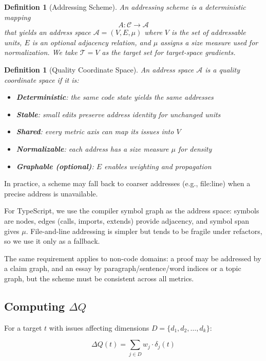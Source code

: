 \documentclass[11pt,a4paper]{article}
\newtheorem{definition}[theorem]{Definition}
\begin{document}
\begin{definition}[Addressing Scheme]
An addressing scheme is a deterministic mapping
\[
A: \mathcal{C} \to \mathcal{A}
\]
that yields an address space $\mathcal{A} = (V, E, \mu)$ where $V$ is the set of addressable units, $E$ is an optional adjacency relation, and $\mu$ assigns a size measure used for normalization. We take $\mathcal{T} = V$ as the target set for target-space gradients.
\end{definition}

\begin{definition}[Quality Coordinate Space]
An address space $\mathcal{A}$ is a \emph{quality coordinate space} if it is:
\begin{itemize}
  \item \textbf{Deterministic}: the same code state yields the same addresses
  \item \textbf{Stable}: small edits preserve address identity for unchanged units
  \item \textbf{Shared}: every metric axis can map its issues into $V$
  \item \textbf{Normalizable}: each address has a size measure $\mu$ for density
  \item \textbf{Graphable (optional)}: $E$ enables weighting and propagation
\end{itemize}
\end{definition}

In practice, a scheme may fall back to coarser addresses (e.g., file:line) when a precise address is unavailable.

For TypeScript, we use the compiler symbol graph as the address space: symbols are nodes, edges (calls, imports, extends) provide adjacency, and symbol span gives $\mu$. File-and-line addressing is simpler but tends to be fragile under refactors, so we use it only as a fallback.

The same requirement applies to non-code domains: a proof may be addressed by a claim graph, and an essay by paragraph/sentence/word indices or a topic graph, but the scheme must be consistent across all metrics.

\subsection{Computing $\Delta Q$}

For a target $t$ with issues affecting dimensions $D = \{d_1, d_2, \ldots, d_k\}$:

\begin{equation}
\Delta Q(t) = \sum_{j \in D} w_j \cdot \delta_j(t)
\label{eq:delta-q}
\end{equation}
\end{document}
